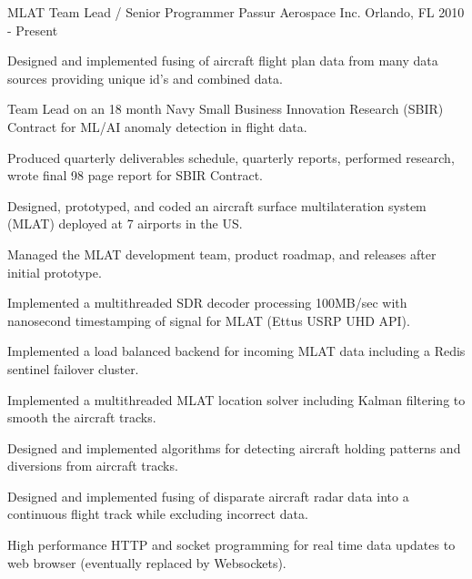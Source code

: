 

\begin{cventries}

  \cventry
    {MLAT Team Lead / Senior Programmer} %
    {Passur Aerospace Inc.} %
    {Orlando, FL} %
    {2010 - Present} %
    {
      \begin{cvitems} %
        \item {Designed and implemented fusing of aircraft flight plan data from many data sources providing unique id's and combined data.}
        \item {Team Lead on an 18 month Navy Small Business Innovation Research (SBIR) Contract for ML/AI anomaly detection in flight data.}
        \item {Produced quarterly deliverables schedule, quarterly reports, performed research, wrote final 98 page report for SBIR Contract.}
        \item {Designed, prototyped, and coded an aircraft surface multilateration system (MLAT) deployed at 7 airports in the US.}
        \item {Managed the MLAT development team, product roadmap, and releases after initial prototype.}
	      \item {Implemented a multithreaded SDR decoder processing 100MB/sec with nanosecond timestamping of signal for MLAT (Ettus USRP UHD API).}
        \item {Implemented a load balanced backend for incoming MLAT data including a Redis sentinel failover cluster.}
        \item {Implemented a multithreaded MLAT location solver including Kalman filtering to smooth the aircraft tracks.}
        \item {Designed and implemented algorithms for detecting aircraft holding patterns and diversions from aircraft tracks.}
        \item {Designed and implemented fusing of disparate aircraft radar data into a continuous flight track while excluding incorrect data.}
        \item {High performance HTTP and socket programming for real time data updates to web browser (eventually replaced by Websockets).}

\end{cvitems}}
\end{cventries}
